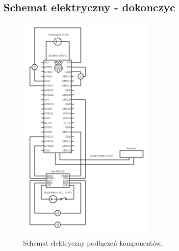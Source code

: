 \documentclass[a4paper,twoside,12pt]{book}
\begin{document}
\newpage
\subsection{Schemat elektryczny - dokonczyc}
\begin{figure}[h]
    \centering
    \includegraphics[width=0.6\textwidth]{Images/Schemat elektryczny/circuit.png}
    \caption{Schemat elektryczny podłączeń komponentów.}
    \label{fig:Schemat elektryczny}
\end{figure}
\newpage
\end{document}
